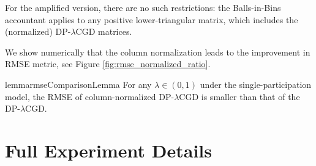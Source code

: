 \documentclass{article}
\theoremstyle{plain}
\theoremstyle{definition}
\theoremstyle{remark}
\newcommand{\method}{DP-$\lambda$CGD\xspace}
\begin{document}
For the amplified version, there are no such restrictions: the Balls-in-Bins accountant
applies to any positive lower-triangular matrix, which includes the (normalized)
\method matrices. 

We show numerically that the column normalization leads to the improvement in RMSE metric, see Figure \ref{fig:rmse_normalized_ratio}.

\begin{restatable}{lemma}{rmseComparisonLemma}
\label{lem:rmse-comparison}
For any $\lambda \in (0,1)$ under the single-participation model, the RMSE of column-normalized \method is smaller than that of the \method.
\end{restatable}
\section{Full Experiment Details}


\begin{table}[t]
\centering
\caption{Runtime comparison (seconds) in  across models and bandwidths for CIFAR-10 training over one epoch. CNN, WideResNet-40, and ViT-B/16 are trained using 8 CPU cores and an NVIDIA A100 GPU. We use a batch size of 512 with a physical batch size of 64. For ViT-L/16 we use NVIDIA H100 GPU with 64 cores and physical batch size 16.}
\label{tab:runtime_comparison}
\end{table}
\end{document}
